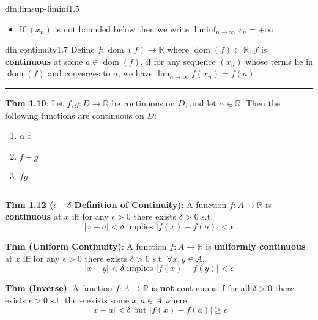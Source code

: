 \documentclass[landscape, 8pt]{extarticle}
\DeclareMathOperator{\dom}{dom}
\begin{document}
\begin{multicols}{3}
\begin{dfn}{dfn:limsup-liminf}{1.5}
\begin{itemize}[leftmargin=*]
		\item If $(x_{n})$ is not bounded below then we write $\liminf_{n \to \infty} x_{n} = +\infty$
	\end{itemize}
	\vspace{-5pt}
\end{dfn}

\vspace{-5pt}
\begin{dfn}[Continuity]{dfn:continuity}{1.7}
	\vspace{-5pt}
	Define $f : \dom(f) \to \mathbb{R}$ where $\dom(f)\subset \mathbb{R}$. $f$ is \textbf{continuous} at some $a\in \dom(f)$, if for any sequence $(x_{n})$ whose terms lie in $\dom(f)$ and converges to $a$, we have $\lim_{n\to \infty} f(x_{n}) = f(a)$.


	\noindent\rule{\textwidth}{0.2pt}
	\textbf{Thm 1.10}: Let $f, g : D \to \mathbb{R}$ be continuous on $D$, and let $\alpha\in \mathbb{R}$. Then the following functions are continuous on $D:$

	\vspace{-10pt}
	\begin{multicols}{3}
		\begin{enumerate}
			\item $\alpha$ f
			\item $f + g$
			\item $fg$
		\end{enumerate}
	\end{multicols}

	\vspace{-5pt}
	\vspace{-10pt}
	\noindent\rule{\textwidth}{0.2pt}

	\textbf{Thm 1.12 ($\epsilon-\delta$ Definition of Continuity)}: A function $f : A \to \mathbb{R}$ is \textbf{continuous} at $x$ iff for any $\epsilon > 0$ there exists $\delta > 0$ s.t.
	\[\lvert x - a \rvert < \delta\text{ implies }\lvert f(x) - f(a) \rvert < \epsilon\]

	\textbf{Thm (Uniform Continuity)}: A function $f : A \to \mathbb{R}$ is \textbf{uniformly continuous} at $x$ iff for any $\epsilon > 0$ there exists $\delta > 0$ s.t. $\forall x,y\in A$,
	\[\lvert x - y \rvert < \delta\text{ implies }\lvert f(x) - f(y) \rvert < \epsilon \]

	\textbf{Thm (Inverse)}: A function $f : A \to \mathbb{R}$ is \textbf{not} continuous if for all $\delta>0$ there exists $\epsilon > 0$ s.t. there exists some $x,a\in A$ where
	\[\lvert x - a \rvert < \delta \text{ but } \lvert f(x) - f(a) \rvert \ge \epsilon\]


\end{dfn}
\end{multicols}
\end{document}
